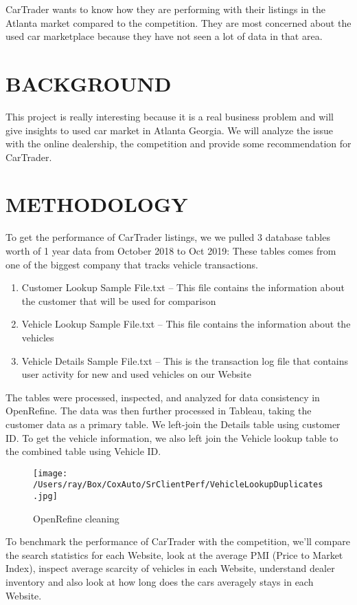 \documentclass[
	12pt, %
	letterpaper, %
]{tPlate}
\begin{document}
CarTrader wants to know how they are performing with their listings in the Atlanta market compared to the competition.  They are most concerned about the used car marketplace because they have not seen a lot of data in that area. 

\section{BACKGROUND}
This project is really interesting because it is a real business problem and will give insights to used car market in Atlanta Georgia.  We will analyze the issue with the online dealership, the competition and provide some recommendation for CarTrader. 

\section{METHODOLOGY}
To get the performance of CarTrader listings, we we pulled 3 database tables worth of 1 year data from October 2018 to Oct 2019:  These tables comes from one of the biggest company that tracks vehicle transactions.

\begin{enumerate}
	\item Customer Lookup Sample File.txt – This file contains the information about the customer that will be used for comparison
	\item Vehicle Lookup Sample File.txt – This file contains the information about the vehicles
	\item Vehicle Details Sample File.txt – This is the transaction log file that contains user activity for new and used vehicles on our Website
\end{enumerate}

The tables were processed, inspected, and analyzed for data consistency in OpenRefine.  The data was then further processed in Tableau, taking the customer data as a primary table. We left-join the Details table using customer ID.  To get the vehicle information, we also left join the Vehicle lookup table to the combined table using Vehicle ID.  

\begin{figure}[H]
	\centering
	\texttt{[image: /Users/ray/Box/CoxAuto/SrClientPerf/VehicleLookupDuplicates.jpg]}
	\caption[Optional caption]{OpenRefine cleaning}
	\label{fig. 1}
\end{figure}

To benchmark the performance of CarTrader with the competition, we'll compare the search statistics for each Website,  look at the average PMI (Price to Market Index), inspect average scarcity of vehicles in each Website, understand dealer inventory and also look at how long does the cars averagely stays in each Website. \\
\end{document}
